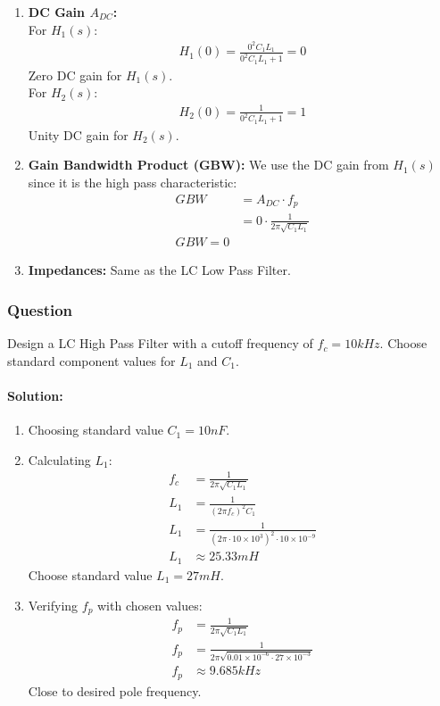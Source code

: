 \begin{enumerate}
  \item \textbf{DC Gain \(A_{DC}\):} \\
    For \(H_1(s)\):
    \begin{align*}
      H_1(0) = \frac{0^2C_1L_1}{0^2C_1L_1 + 1} = 0
    \end{align*}
    Zero DC gain for \(H_1(s)\). \\
    For \(H_2(s)\):
    \begin{align*}
      H_2(0) = \frac{1}{0^2C_1L_1 + 1} = 1
    \end{align*}
    Unity DC gain for \(H_2(s)\).
  \item \textbf{Gain Bandwidth Product (GBW):}
    We use the DC gain from \(H_1(s)\) since it is the
    high pass characteristic:
    \begin{align*}
      GBW &= A_{DC} \cdot f_p \\
      &= 0 \cdot \frac{1}{2 \pi \sqrt{C_1L_1}} \\
      \boxed{GBW = 0}
    \end{align*}
  \item \textbf{Impedances:}
    Same as the LC Low Pass Filter.
\end{enumerate}

\subsubsection{Question}
Design a LC High Pass Filter with a cutoff frequency of
\(f_c = 10 kHz\). Choose standard component values for \(L_1\)
and \(C_1\).
\paragraph{Solution:}
\begin{enumerate}
  \item Choosing standard value \(C_1 = 10 nF\).
  \item Calculating $L_1$:
    \begin{align*}
      f_c &= \frac{1}{2 \pi \sqrt{C_1L_1}} \\
      L_1 &= \frac{1}{(2 \pi f_c)^2 C_1} \\
      L_1 &= \frac{1}{(2 \pi \cdot 10 \times 10^3)^2 \cdot 10 \times 10^{-9}} \\
      L_1 &\approx 25.33 mH
    \end{align*}
    Choose standard value \(L_1 = 27 mH\).
  \item Verifying $f_p$ with chosen values:
    \begin{align*}
      f_p &= \frac{1}{2 \pi \sqrt{C_1L_1}} \\
      f_p &= \frac{1}{2 \pi \sqrt{0.01 \times 10^{-6} \cdot 27 \times 10^{-3}}} \\
      f_p &\approx 9.685 kHz
    \end{align*}
    Close to desired pole frequency.
\end{enumerate}
